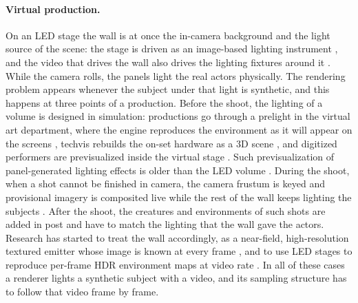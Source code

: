 \documentclass[acmtog,review]{acmart}
\begin{document}
{\paragraph{Virtual production.}
On an LED stage the wall is at once the in-camera background and the light source of
the scene: the stage is driven as an image-based lighting instrument
\cite{debevec2022dilation,legendre2022jointly}, and the video that
drives the wall also drives the lighting fixtures around it \cite{bengtsson2022ibl}.
While the camera rolls, the panels light the real actors physically. The rendering
problem appears whenever the subject under that light is synthetic, and this happens
at three points of a production. Before the shoot, the lighting of a volume is designed
in simulation: productions go through a prelight in the virtual art department, where
the engine reproduces the environment as it will appear on the screens
\cite{kadner2023stages,zwerman2023ves}, techvis rebuilds the on-set hardware as a 3D
scene \cite{failes2024hotd}, and digitized performers are previsualized inside the
virtual stage \cite{nash2025integration}. Such previsualization of panel-generated lighting effects is older than the LED volume \cite{bunish2017rogueone,seymour2013gravity,hamon2014gravity}. During the shoot, when a shot cannot be finished
in camera, the camera frustum is keyed and provisional imagery is composited live
while the rest of the wall keeps lighting the subjects \cite{kadner2021fieldguide}.
After the shoot, the creatures and environments of such shots are added in post
\cite{failes2022hotd} and have to match the lighting that the wall gave the actors.
Research has started to treat the wall accordingly, as a near-field, high-resolution
textured emitter whose image is known at every frame \cite{azzarelli2026relightable},
and to use LED stages to reproduce per-frame HDR environment maps at video rate
\cite{zhang2026pixelcube}. In all of these cases a renderer lights a synthetic subject
with a video, and its sampling structure has to follow that video frame by frame.

}
\end{document}
